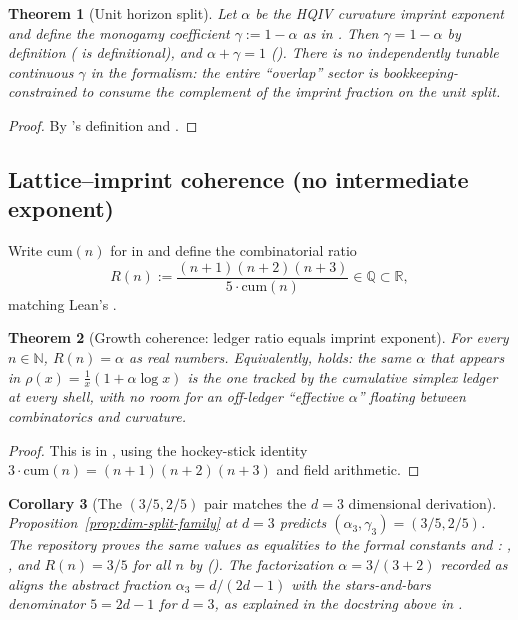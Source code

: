 \documentclass[11pt]{amsart}
\newtheorem{theorem}{Theorem}[section]
\newtheorem{corollary}[theorem]{Corollary}
\begin{document}
\begin{theorem}[Unit horizon split]
\label{thm:unit-split}
Let \(\alpha\) be the HQIV curvature imprint exponent  and define the monogamy coefficient \(\gamma:=1-\alpha\) as  in . Then \(\gamma=1-\alpha\) by definition ( is definitional), and \(\alpha+\gamma=1\) (). There is no independently tunable continuous \(\gamma\) in the formalism: the entire ``overlap'' sector is bookkeeping-constrained to consume the complement of the imprint fraction on the unit split.
\end{theorem}

\begin{proof}
By 's definition and .
\end{proof}

\subsection{Lattice--imprint coherence (no intermediate exponent)}

Write \(\mathrm{cum}(n)\) for  in  and define the combinatorial ratio
\[
R(n):=\frac{(n+1)(n+2)(n+3)}{5\cdot \mathrm{cum}(n)}\in\mathbb{Q}\subset\mathbb{R},
\]
matching Lean's .

\begin{theorem}[Growth coherence: ledger ratio equals imprint exponent]
\label{thm:growth-coherence}
For every \(n\in\mathbb{N}\), \(R(n)=\alpha\) as real numbers. Equivalently,  holds: the same \(\alpha\) that appears in \(\rho(x)=\frac1x(1+\alpha\log x)\) is the one tracked by the cumulative simplex ledger at \emph{every} shell, with no room for an off-ledger ``effective \(\alpha\)'' floating between combinatorics and curvature.
\end{theorem}

\begin{proof}
This is  in , using the hockey-stick identity \(3\cdot\mathrm{cum}(n)=(n+1)(n+2)(n+3)\) and field arithmetic.
\end{proof}

\begin{corollary}[The \((3/5,2/5)\) pair matches the \(d=3\) dimensional derivation]
\label{cor:three-fifths-two-fifths}
Proposition~\ref{prop:dim-split-family} at \(d=3\) predicts \((\alpha_3,\gamma_3)=(3/5,2/5)\). The repository proves the same values as equalities to the formal constants  and : , , and \(R(n)=3/5\) for all \(n\) by  (). The factorization \(\alpha=3/(3+2)\) recorded as  aligns the abstract fraction \(\alpha_3=d/(2d-1)\) with the stars-and-bars denominator \(5=2d-1\) for \(d=3\), as explained in the docstring above  in .
\end{corollary}
\end{document}
